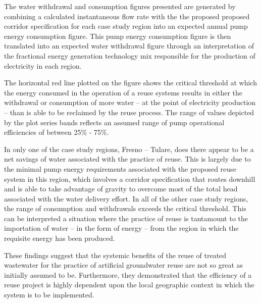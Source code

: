 The water withdrawal and consumption figures presented are generated by combining a calculated instantaneous flow rate with the the proposed proposed corridor specification for each case study region into an expected annual pump energy consumption figure. This pump energy consumption figure is then translated into an expected water withdrawal figure through an interpretation of the fractional energy generation technology mix responsible for the production of electricity in each region. 

The horizontal red line plotted on the figure shows the critical threshold at which the energy consumed in the operation of a reuse systems results in either the withdrawal or consumption of more water -- at the point of electricity production -- than is able to be reclaimed by the reuse process. The range of values depicted by the plot series bands reflects an assumed range of pump operational efficiencies of between 25\% - 75\%.

In only one of the case study regions, Fresno -- Tulare, does there appear to be a net savings of water associated with the practice of reuse. This is largely due to the minimal pump energy requirements associated with the proposed reuse system in this region, which involves a corridor specification that routes downhill and is able to take advantage of gravity to overcome most of the total head associated with the water delivery effort. In all of the other case study regions, the range of consumption and withdrawals exceeds the critical threshold. This can be interpreted a situation where the practice of reuse is tantamount to the importation of water -- in the form of energy -- from the region in which the requisite energy has been produced.

These findings suggest that the systemic benefits of the reuse of treated wastewater for the practice of artificial groundwater reuse are not so great as initially assumed to be. Furthermore, they demonstrated that the efficiency of a reuse project is highly dependent upon the local geographic context in which the system is to be  implemented. 
    
